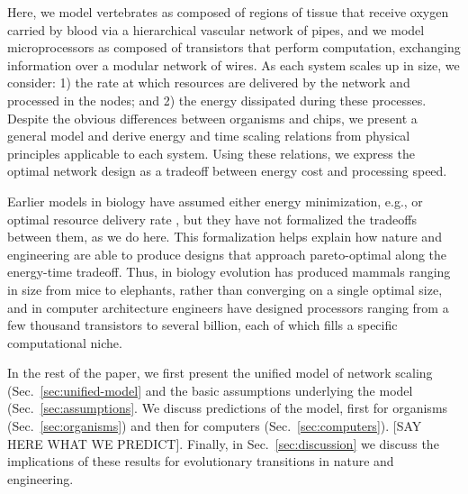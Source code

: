 \documentclass[12pt]{article}
\begin{document}
Here, we model vertebrates as composed of regions of tissue that receive oxygen
carried by blood via a hierarchical vascular network of pipes, and we model
microprocessors as composed of transistors that perform computation, exchanging
information over a modular network of wires.  As each system scales up in size,
we consider: 1) the rate at which resources are delivered by the network and
processed in the nodes; and 2) the energy dissipated during these processes.
Despite the obvious differences between organisms and chips, we present a
general model and derive energy and time scaling relations from physical
principles applicable to each system. Using these relations, we express the
optimal network design as a tradeoff between energy cost and processing speed. 


Earlier models in biology have assumed either energy minimization, e.g.,
\cite{west97} or optimal resource delivery rate \cite{banavar10}, but they have
not formalized the tradeoffs between them, as we do here.  This formalization
helps explain how  nature and engineering are able to produce designs that
approach pareto-optimal along the energy-time tradeoff.  Thus, in biology
evolution has produced mammals ranging in size from mice to elephants, rather
than converging on a single optimal size, and in computer architecture
engineers have designed processors ranging from a few thousand transistors to
several billion, each of which fills a specific computational niche.

In the rest of the paper, we first present the unified model of network scaling
(Sec.~\ref{sec:unified-model} and the basic assumptions underlying the model
(Sec.~\ref{sec:assumptions}.  We discuss predictions of the model, first for
organisms (Sec.~\ref{sec:organisms}) and then for computers
(Sec.~\ref{sec:computers}). [SAY HERE WHAT WE PREDICT].  Finally, in
Sec.~\ref{sec:discussion}  we discuss the implications of these results for
evolutionary transitions in nature and engineering.
\end{document}
